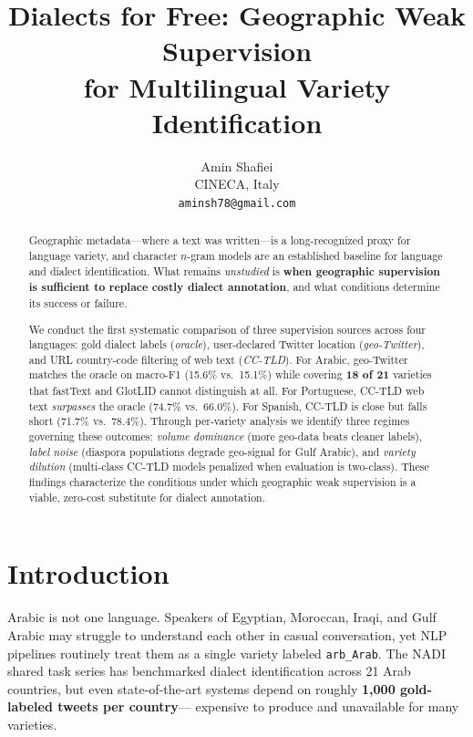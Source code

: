 \documentclass[11pt]{article}
\title{Dialects for Free: Geographic Weak Supervision\\
       for Multilingual Variety Identification}
\author{
  Amin Shafiei \\
  CINECA, Italy \\
  \texttt{aminsh78@gmail.com}
}
\begin{document}
\maketitle

\begin{abstract}
Geographic metadata---where a text was written---is a long-recognized proxy
for language variety, and character $n$-gram models are an established baseline
for language and dialect identification.
What remains \emph{unstudied} is \textbf{when geographic supervision is
sufficient to replace costly dialect annotation}, and what conditions determine
its success or failure.

We conduct the first systematic comparison of three supervision sources
across four languages: gold dialect labels (\textit{oracle}), user-declared
Twitter location (\textit{geo-Twitter}), and URL country-code filtering of
web text (\textit{CC-TLD}).
For Arabic, geo-Twitter matches the oracle on macro-F1 (15.6\% vs.\ 15.1\%)
while covering \textbf{18 of 21} varieties that fastText and GlotLID cannot
distinguish at all.
For Portuguese, CC-TLD web text \emph{surpasses} the oracle (74.7\%
vs.\ 66.0\%).
For Spanish, CC-TLD is close but falls short (71.7\% vs.\ 78.4\%).
Through per-variety analysis we identify three regimes governing these
outcomes: \textit{volume dominance} (more geo-data beats cleaner labels),
\textit{label noise} (diaspora populations degrade geo-signal for Gulf Arabic),
and \textit{variety dilution} (multi-class CC-TLD models penalized when
evaluation is two-class).
These findings characterize the conditions under which geographic weak
supervision is a viable, zero-cost substitute for dialect annotation.
\end{abstract}

\section{Introduction}
\label{sec:intro}

Arabic is not one language. Speakers of Egyptian, Moroccan, Iraqi, and Gulf
Arabic may struggle to understand each other in casual conversation, yet NLP
pipelines routinely treat them as a single variety labeled \texttt{arb\_Arab}.
The NADI shared task series \cite{abdul-mageed-etal-2020-nadi} has benchmarked
dialect identification across 21 Arab countries, but even state-of-the-art
systems depend on roughly \textbf{1{,}000 gold-labeled tweets per country}---
expensive to produce and unavailable for many varieties.
\end{document}
